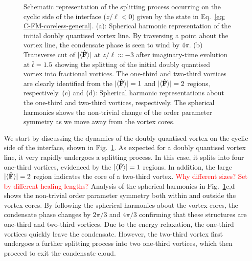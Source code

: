 \begin{figure}
    \caption[Dynamics of the doubly quantised vortex connection in a cyclic to a
        ferromagnetic interface]
    {\label{fig: C-FM-coreless-cyclic}Schematic representation of the
        splitting process occurring on the cyclic side of the interface
        (\(z/\ell < 0\)) given by the state in
        Eq.~\eqref{eq: C-FM-coreless-general}.
        (a): Spherical harmonic representation of the initial doubly quantised
        vortex line. By traversing a point about the vortex line, the condensate
        phase is seen to wind by \(4\pi \).
        (b) Transverse cut of \(|\langle \hat{\vb{F}} \rangle | \) at \(z/\ell \approx -3\) after
        imaginary-time evolution at \(\bar{t} = 1.5\) showing the splitting of
        the initial doubly quantised vortex into fractional vortices.
        The one-third and two-third vortices are clearly identified from the
        \(|\langle \hat{\vb{F}} \rangle | = 1\) and \(|\langle \hat{\vb{F}} \rangle | = 2\) regions, respectively.
        (c) and (d): Spherical harmonic representations about the one-third and
        two-third vortices, respectively.
        The spherical harmonics shows the non-trivial change of the order
        parameter symmetry as we move away from the vortex cores.}
\end{figure}
We start by discussing the dynamics of the doubly quantised vortex on the cyclic
side of the interface, shown in Fig.~\ref{fig: C-FM-coreless-cyclic}.
As expected for a doubly quantised vortex line, it very rapidly undergoes a
splitting process.
In this case, it splits into four one-third vortices, evidenced by the
\(|\langle \hat{\vb{F}} \rangle | = 1\) regions.
In addition, the large \(|\langle \hat{\vb{F}} \rangle | = 2\) region indicates the core of a two-third
vortex.
\textcolor{red}{Why different sizes? Set by different healing lengths?}
Analysis of the spherical harmonics in Fig.~\ref{fig: C-FM-coreless-cyclic}c,d
shows the non-trivial order parameter symmetry both within and outside the
vortex cores.
By following the spherical harmonics about the vortex cores, the condensate
phase changes by \(2\pi/3\) and \(4\pi/3\) confirming that these structures are
one-third and two-third vortices.
Due to the energy relaxation, the one-third vortices quickly leave the
condensate.
However, the two-third vortex first undergoes a further splitting process into
two one-third vortices, which then proceed to exit the condensate cloud.

